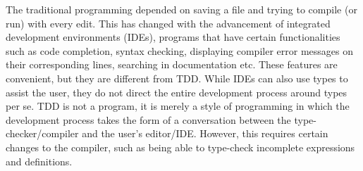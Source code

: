 The traditional programming depended on saving a file and trying to compile (or
run) with every edit. This has changed with the advancement of integrated
development environments (IDEs), programs that have certain functionalities
such as code completion, syntax checking, displaying compiler error messages on
their corresponding lines, searching in documentation etc.
These features are convenient, but they are different from TDD.
While IDEs can also use types to assist the user, they do not direct the
entire development process around types per se.
TDD is not a program, it is merely a style of programming in which
the development process takes the form of a conversation between the
type-checker/compiler and the user's editor/IDE.  However, this requires
certain changes to the compiler, such as being able to type-check incomplete
expressions and definitions.\cite{tdd}

